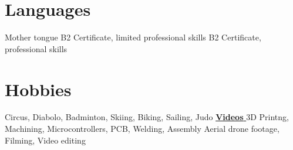 \documentclass[a4paper]{twentysecondcv} %
\begin{document}
\vspace{-0.8cm}
\section{Languages}
\vspace{-0.1cm}
\begin{twenty} %
	\vspace{-0.3cm}
	\twentyitem
    	{\textnormal{\textbf{\scalebox{1.1}{French}}}}
        {}
        {\textnormal{Mother tongue}}
        {}
        {}
        {}
    \vspace{-0.3cm}
    \twentyitem
    	{\textnormal{\textbf{\scalebox{1.1}{German}}}}
        {}
        {\textnormal{B2 Certificate, limited professional skills}}
        {}
        {}
        {}
	\twentyitem
    	{\textnormal{\textbf{\scalebox{1.1}{English}}}}
        {}
        {\textnormal{B2 Certificate, professional skills}}
        {}
        {}
        {}
\end{twenty}

\vspace{-0.4cm}
\section{Hobbies}
\vspace{-0.1cm}
\begin{twenty} %
    \vspace{-0.3cm}
    \twentyitem
    	{\textnormal{\textbf{\scalebox{1.1}{Sport}}}}
        {}
        {\textnormal{Circus, Diabolo, Badminton, Skiing, Biking, Sailing, Judo \hfill\href{https://www.youtube.com/watch?v=k7dW7igYiwI&list=PLYHF3kEHYpgf9jwPGn_NW_Ha0ea9cQ2uj}{\textbf{Videos \mpoint}}}}
        {}
        {}
        {}
    \vspace{-0.3cm}
	\twentyitem
    	{\textnormal{\textbf{\scalebox{1.1}{DIY}}}}
        {}
        {\textnormal{3D Printng, Machining, Microcontrollers, PCB, Welding, Assembly}}
        {}
        {}
        {}
    \twentyitem
    	{\textnormal{\textbf{\scalebox{1.1}{Video}}}}
        {}
        {\textnormal{Aerial drone footage, Filming, Video editing}}
        {}
        {}
        {}

\end{twenty}
\clearpage
\end{document}
